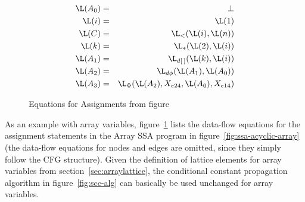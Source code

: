 \begin{figure}%
\begin{eqnarray*}
\L(A_0) & = & \bot \\
\L(i) & = & \L(1) \\
\L(C) & = & \L_{<}(\L(i),\L(n))  \\
\L(k) & = & \L_{*}(\L(2), \L(i)) \\
\L(A_1) & = & \L_{d[\:]}(\L(k), \L(i)) \\
\L(A_2) & = & \L_{d\phi}(\L(A_1), \L(A_0)) \\
\L(A_3) & = & \L_{\Phi}(\L(A_2), X_{e24}, \L(A_0), X_{e14}) \\
\end{eqnarray*}
\caption{Equations for Assignments from figure \protect{\ref{fig:ssa-acyclic-array}}}
\label{fig:equations-array}
\end{figure}


As an example with array variables, figure~\ref{fig:equations-array} lists the data-flow
equations for the assignment statements in the Array SSA program in
figure~\ref{fig:ssa-acyclic-array} (the data-flow equations for nodes
and edges are omitted, since they
simply follow the CFG structure).
Given the definition of lattice elements for
array variables from section~\ref{sec:arraylattice},
the conditional constant propagation algorithm
in figure~\ref{fig:scc-alg} can basically be used unchanged for  
array variables.


